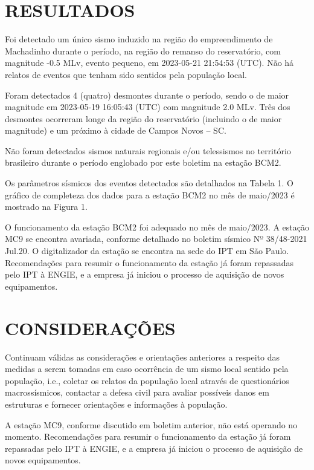 \documentclass[12pt]{iptex}
\begin{document}
\section{RESULTADOS}
\label{sec:resultados}
Foi detectado um único sismo induzido na região do empreendimento de Machadinho durante o período, na região do remanso do reservatório, com magnitude -0.5 MLv, evento pequeno, em 2023-05-21 21:54:53 (UTC). Não há relatos de eventos que tenham sido sentidos pela população local.

Foram detectados 4 (quatro) desmontes durante o período, sendo o de maior magnitude em 2023-05-19 16:05:43 (UTC) com magnitude 2.0 MLv. Três dos desmontes ocorreram longe da região do reservatório (incluindo o de maior magnitude) e um próximo à cidade de Campos Novos – SC.

Não foram detectados sismos naturais regionais e/ou telessismos no território brasileiro durante o período englobado por este boletim na estação BCM2.

Os parâmetros sísmicos dos eventos detectados são detalhados na Tabela 1. O gráfico de completeza dos dados para a estação BCM2 no mês de maio/2023 é mostrado na Figura 1.

O funcionamento da estação BCM2 foi adequado no mês de maio/2023. A estação MC9 se encontra avariada, conforme detalhado no boletim sísmico Nº 38/48-2021 Jul.20. O digitalizador da estação se encontra na sede do IPT em São Paulo. Recomendações para resumir o funcionamento da estação já foram repassadas pelo IPT à ENGIE, e a empresa já iniciou o processo de aquisição de novos equipamentos.

\section{CONSIDERAÇÕES}
\label{sec:consideracoes}
Continuam válidas as considerações e orientações anteriores a respeito das medidas a serem tomadas em caso ocorrência de um sismo local sentido pela população, i.e., coletar os relatos da população local através de questionários macrossísmicos, contactar a defesa civil para avaliar possíveis danos em estruturas e fornecer orientações e informações à população.

A estação MC9, conforme discutido em boletim anterior, não está operando no momento. Recomendações para resumir o funcionamento da estação já foram repassadas pelo IPT à ENGIE, e a empresa já iniciou o processo de aquisição de novos equipamentos.

\end{document}
